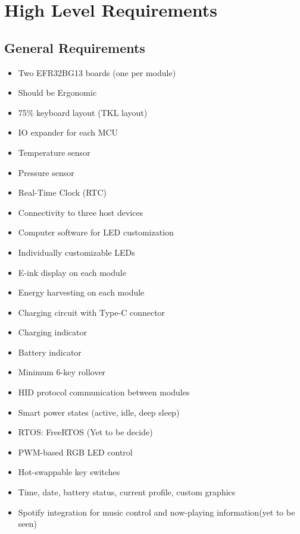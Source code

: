 \documentclass[a4paper,11pt]{article}%
\begin{document}
\section{High Level Requirements}


\subsection{General Requirements}
\begin{itemize}
\item Two EFR32BG13 boards (one per module)
\item Should be Ergonomic
\item 75\% keyboard layout (TKL layout)
\item IO expander for each MCU
\item Temperature sensor
\item Pressure sensor
\item Real-Time Clock (RTC)
\item Connectivity to three host devices
\item Computer software for LED customization
\item Individually customizable LEDs
\item E-ink display on each module
\item Energy harvesting on each module
\item Charging circuit with Type-C connector
\item Charging indicator
\item Battery indicator
\item Minimum 6-key rollover
\item HID protocol communication between modules
\item Smart power states (active, idle, deep sleep)
\item RTOS: FreeRTOS (Yet to be decide)
\item PWM-based RGB LED control
\item Hot-swappable key switches
\item Time, date, battery status, current profile, custom graphics
\item Spotify integration for music control and now-playing information(yet to be seen)
\end{itemize}
\end{document}
